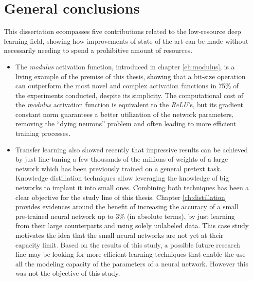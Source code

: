 
\chapter{General conclusions} \label{ch:conclusions}
This dissertation ecompasses five contributions related to the low-resource deep learning field, showing how improvements of state of the art can be made without necessarily needing to spend a prohibitive amount of resources. 

\begin{itemize}
\item The \textit{modulus} activation function, introduced in chapter \ref{ch:modulus}, is a living example of the premise of this thesis, showing that a bit-size operation can outperform the most novel and complex activation functions in 75\% of the experiments conducted, despite its simplicity. The computational cost of the \textit{modulus} activation function is equivalent to the \textit{ReLU}'s, but its gradient constant  norm guarantees a better utilization of the network parameters, removing the ``dying neurons'' problem and often leading to more efficient training processes.

\item Transfer learning also showed recently that impressive results can be achieved by just fine-tuning a few thousands of the millions of weights of a large network which has been previously trained on a general pretext task. Knowledge distillation techniques allow leveraging the knowledge of big networks to implant it into small ones. Combining both techniques has been a clear objective for the study line of this thesis. Chapter \ref{ch:distillation} provides evidences around the benefit of increasing the accuracy of a small pre-trained neural network up to 3\% (in absolute terms), by just learning from their large counterparts and using solely unlabeled data. This case study motivates the idea that the small neural networks are not yet at their capacity limit. Based on the results of this study, a possible future research line may be looking for more efficient learning techniques that enable the use all the modeling capacity of the parameters of a neural network. However this was not the objective of this study.


\end{itemize}
